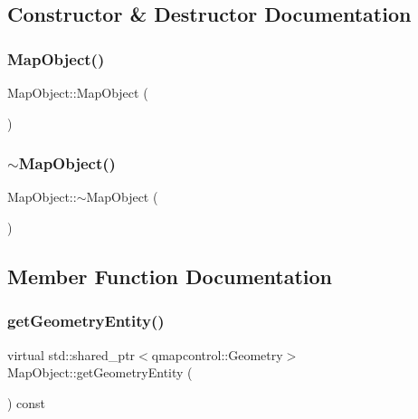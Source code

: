 \subsection{Constructor \& Destructor Documentation}
\mbox{\label{class_map_object_a568754515cc72ce0861d30c3040d26d2}} 
\subsubsection{\texorpdfstring{MapObject()}{MapObject()}}
{\footnotesize\ttfamily Map\+Object\+::\+Map\+Object (\begin{DoxyParamCaption}{ }\end{DoxyParamCaption})}

\mbox{\label{class_map_object_aa601344267a49df197e841fcbd732209}} 
\subsubsection{\texorpdfstring{$\sim$MapObject()}{~MapObject()}}
{\footnotesize\ttfamily Map\+Object\+::$\sim$\+Map\+Object (\begin{DoxyParamCaption}{ }\end{DoxyParamCaption})\hspace{0.3cm}{\ttfamily [virtual]}}



\subsection{Member Function Documentation}
\mbox{\label{class_map_object_a82e055e41c862ec8d80d5bfb137b3253}} 
\subsubsection{\texorpdfstring{getGeometryEntity()}{getGeometryEntity()}}
{\footnotesize\ttfamily virtual std\+::shared\+\_\+ptr$<$qmapcontrol\+::\+Geometry$>$ Map\+Object\+::get\+Geometry\+Entity (\begin{DoxyParamCaption}{ }\end{DoxyParamCaption}) const\hspace{0.3cm}{\ttfamily [pure virtual]}}




